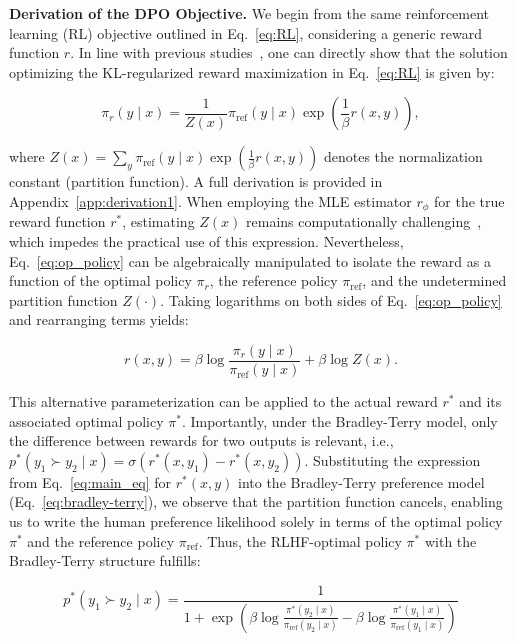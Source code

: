 \textbf{Derivation of the DPO Objective.} We begin from the same reinforcement learning (RL) objective outlined in Eq.~\ref{eq:RL}, considering a generic reward function $r$. In line with previous studies~\citep{peters2007reinforcement, peng2019advantage, korbak2022reinforcement, go2023aligning}, one can directly show that the solution optimizing the KL-regularized reward maximization in Eq.~\ref{eq:RL} is given by:

\begin{equation}\label{eq:op_policy}
    \pi_r(y\mid x) = \frac{1}{Z(x)}\pi_\text{ref}(y\mid x)\exp\left(\frac{1}{\beta}r(x, y)\right),
\end{equation}

where $Z(x) =\sum_{y}\pi_\text{ref}(y\mid x)\exp\left(\frac{1}{\beta}r(x, y)\right)$ denotes the normalization constant (partition function). A full derivation is provided in Appendix~\ref{app:derivation1}. When employing the MLE estimator $r_\phi$ for the true reward function $r^*$, estimating $Z(x)$ remains computationally challenging~\citep{korbak2022reinforcement, go2023aligning}, which impedes the practical use of this expression. Nevertheless, Eq.~\ref{eq:op_policy} can be algebraically manipulated to isolate the reward as a function of the optimal policy $\pi_r$, the reference policy $\pi_\text{ref}$, and the undetermined partition function $Z(\cdot)$. Taking logarithms on both sides of Eq.~\ref{eq:op_policy} and rearranging terms yields:

\begin{equation}\label{eq:main_eq}
    r(x,y) =\beta \log \frac{\pi_r(y\mid x)}{\pi_\text{ref}(y\mid x)} + \beta \log Z(x).
\end{equation}

This alternative parameterization can be applied to the actual reward $r^*$ and its associated optimal policy $\pi^*$. Importantly, under the Bradley-Terry model, only the difference between rewards for two outputs is relevant, i.e., ${p^*(y_1 \succ y_2 \mid x) = \sigma(r^*(x, y_1) - r^*(x, y_2))}$. Substituting the expression from Eq.~\ref{eq:main_eq} for $r^*(x,y)$ into the Bradley-Terry preference model (Eq.~\ref{eq:bradley-terry}), we observe that the partition function cancels, enabling us to write the human preference likelihood solely in terms of the optimal policy $\pi^*$ and the reference policy $\pi_\text{ref}$. Thus, the RLHF-optimal policy $\pi^*$ with the Bradley-Terry structure fulfills:

\begin{equation}\label{eq:objective}
    p^*(y_1\succ y_2 \mid x)=\frac{1}{1 + \exp\left(\beta \log \frac{\pi^*(y_2\mid x)}{\pi_\text{ref}(y_2\mid x)} - \beta \log \frac{\pi^*(y_1\mid x)}{\pi_\text{ref}(y_1\mid x)}\right)}
\end{equation}

